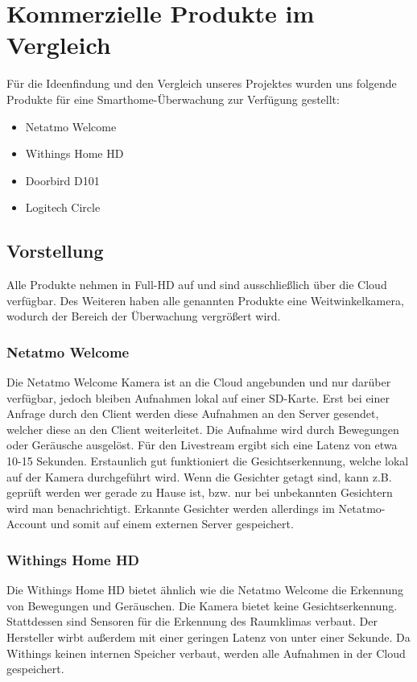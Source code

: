 \chapter{Kommerzielle Produkte im Vergleich}
Für die Ideenfindung und den Vergleich unseres Projektes wurden uns folgende Produkte für eine Smarthome-Überwachung zur Verfügung gestellt:

\begin{itemize}
	\item Netatmo Welcome
	\item Withings Home HD
	\item Doorbird D101
	\item Logitech Circle
\end{itemize}

\section{Vorstellung}

Alle Produkte nehmen in Full-HD  auf und sind ausschließlich über die Cloud verfügbar. Des Weiteren haben alle genannten Produkte eine Weitwinkelkamera, wodurch der Bereich der Überwachung vergrößert wird.

\subsection{Netatmo Welcome}
Die Netatmo Welcome Kamera ist an die Cloud angebunden und nur darüber verfügbar, jedoch bleiben Aufnahmen lokal auf einer SD-Karte. Erst bei einer Anfrage durch den Client werden diese Aufnahmen an den Server gesendet, welcher diese an den Client weiterleitet. Die Aufnahme wird durch Bewegungen oder Geräusche ausgelöst. Für den Livestream ergibt sich eine Latenz von etwa 10-15 Sekunden. Erstaunlich gut funktioniert die Gesichtserkennung, welche lokal auf der Kamera durchgeführt wird. Wenn die Gesichter getagt sind, kann z.B. geprüft werden wer gerade zu Hause ist, bzw. nur bei unbekannten Gesichtern wird man benachrichtigt. Erkannte Gesichter werden allerdings im Netatmo-Account und somit auf einem externen Server gespeichert.

\subsection{Withings Home HD}
Die Withings Home HD bietet ähnlich wie die Netatmo Welcome die Erkennung von Bewegungen und Geräuschen. Die Kamera bietet keine Gesichtserkennung. Stattdessen sind Sensoren für die Erkennung des Raumklimas verbaut. Der Hersteller wirbt außerdem mit einer geringen Latenz von unter einer Sekunde. Da Withings keinen internen Speicher verbaut, werden alle Aufnahmen in der Cloud gespeichert.

